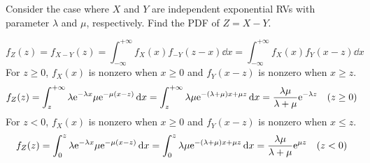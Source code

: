 \documentclass[device=normal, lang=en]{elegantbook}
\numberwithin{equation}{section}
\begin{document}
\begin{example}
    Consider the case where $X$ and $Y$ are independent exponential RVs with parameter $\lambda$ and $\mu$, respectively. Find the PDF of $Z = X - Y$.
\end{example}
\begin{solution}
    \begin{equation}
        f_{Z}(z) = f_{X-Y}(z) = \int_{-\infty}^{+\infty} f_{X}(x) f_{-Y}(z - x) \dd{x} = \int_{-\infty}^{+\infty} f_{X}(x) f_{Y}(x - z) \dd{x}
    \end{equation}
    For $z \geq 0$, $f_{X}(x)$ is nonzero when $x \geq 0$ and $f_{Y}(x - z)$ is nonzero when $x \geq z$.
    \begin{equation}
        f_{Z}(z) = \int_{z}^{+\infty} \lambda \mathrm{e}^{-\lambda x} \mu \mathrm{e}^{-\mu (x - z)} \dd{x} = \int_{z}^{+\infty} \lambda \mu \mathrm{e}^{-(\lambda + \mu)x + \mu z} \dd{x} = \frac{\lambda \mu}{\lambda + \mu} \mathrm{e}^{-\lambda z} \quad (z \geq 0)
    \end{equation}
    For $z < 0$, $f_{X}(x)$ is nonzero when $x \geq 0$ and $f_{Y}(x - z)$ is nonzero when $x \leq z$.
    \begin{equation}
        f_{Z}(z) = \int_{0}^{z} \lambda \mathrm{e}^{-\lambda x} \mu \mathrm{e}^{-\mu (x - z)} \dd{x} = \int_{0}^{z} \lambda \mu \mathrm{e}^{-(\lambda + \mu)x + \mu z} \dd{x} = \frac{\lambda \mu}{\lambda + \mu} \mathrm{e}^{\mu z} \quad (z < 0)
    \end{equation}
\end{solution}
\end{document}

